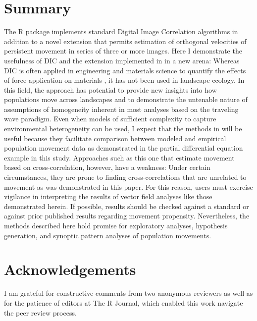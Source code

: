 \hypertarget{summary}{%
\section{Summary}\label{summary}}

The  R package implements standard Digital Image
Correlation algorithms in addition to a novel extension that permits
estimation of orthogonal velocities of persistent movement in series of
three or more images. Here I demonstrate the usefulness of DIC and the
extension implemented in  in a new arena:
Whereas DIC is often applied in engineering and materials science to
quantify the effects of force application on materials
\citep{Sutton2009}, it has not been used in landscape ecology. In this
field, the approach has potential to provide new insights into how
populations move across landscapes and to demonstrate the untenable
nature of assumptions of homogeneity inherent in most analyses based on
the traveling wave paradigm. Even when models of sufficient complexity
to capture environmental heterogeneity can be used, I expect that the
methods in  will be useful because they
facilitate comparison between modeled and empirical population movement
data as demonstrated in the partial differential equation example in
this study. Approaches such as this one that estimate movement based on
cross-correlation, however, have a weakness: Under certain
circumstances, they are prone to finding cross-correlations that are
unrelated to movement as was demonstrated in this paper. For this
reason, users must exercise vigilance in interpreting the results of
vector field analyses like those demonstrated herein. If possible,
results should be checked against a standard or against prior published
results regarding movement propensity. Nevertheless, the methods
described here hold promise for exploratory analyses, hypothesis
generation, and synoptic pattern analyses of population movements.

\hypertarget{acknowledgements}{%
\section{Acknowledgements}\label{acknowledgements}}

I am grateful for constructive comments from two anonymous reviewers as
well as for the patience of editors at The R Journal, which enabled this
work navigate the peer review process.



\address{%
Devin W. Goodsman\\
Natural Resources Canada\\%
5320 122 St NW,\\ Edmonton, Alberta, T6H 3S5\\ Canada\\
%
NA\\%
\textit{ORCiD: \href{https://orcid.org/0000-0003-1935-5779}{0000-0003-1935-5779}}\\%
\href{mailto:devin.goodsman@nrcan-rncan.gc.ca}{\nolinkurl{devin.goodsman@nrcan-rncan.gc.ca}}%
}
